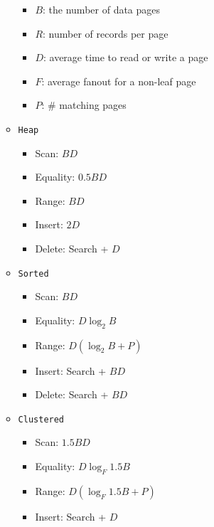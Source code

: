 \documentclass[landscape,8pt]{extarticle}
\newcommand{\code}{\lstinline}
\begin{document}
\begin{multicols}{5}
\begin{itemize}
\begin{itemize}
                        \begin{itemize}
                            \item $B$: the number of data pages
                            \item $R$: number of records per page
                            \item $D$: average time to read or write a page
                            \item $F$: average fanout for a non-leaf page
                            \item $P$: \# matching pages
                        \end{itemize}
                  \item \code{Heap}
                        \begin{itemize}
                            \item Scan: $BD$
                            \item Equality: $0.5 BD$
                            \item Range: $BD$
                            \item Insert: $2D$
                            \item Delete: Search + $D$
                        \end{itemize}
                  \item \code{Sorted}
                        \begin{itemize}
                            \item Scan: $BD$
                            \item Equality: $D \log_2 B$
                            \item Range: $D(\log_2 B + P)$
                            \item Insert: Search + $BD$
                            \item Delete: Search + $BD$
                        \end{itemize}
                  \item \code{Clustered}
                        \begin{itemize}
                            \item Scan: $1.5 BD$
                            \item Equality: $D \log_F 1.5 B$
                            \item Range: $D(\log_F 1.5B + P)$
                            \item Insert: Search + $D$

\end{itemize}
\end{itemize}
\end{itemize}
\end{multicols}
\end{document}
